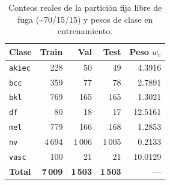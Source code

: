 \begin{table}[htbp]\centering\normalsize
\setlength{\tabcolsep}{8pt}
\caption{Conteos reales de la partición fija libre de fuga (\textasciitilde 70/15/15) y pesos de clase en entrenamiento.}
\begin{tabularx}{\textwidth}{>{\raggedright\arraybackslash}Xrrrr}\toprule
\textbf{Clase} & \textbf{Train} & \textbf{Val} & \textbf{Test} & \textbf{Peso $w_c$} \\ \midrule
\texttt{akiec} & 228 & 50 & 49 & 4.3916 \\
\texttt{bcc} & 359 & 77 & 78 & 2.7891 \\
\texttt{bkl} & 769 & 165 & 165 & 1.3021 \\
\texttt{df} & 80 & 18 & 17 & 12.5161 \\
\texttt{mel} & 779 & 166 & 168 & 1.2853 \\
\texttt{nv} & 4\,694 & 1\,006 & 1\,005 & 0.2133 \\
\texttt{vasc} & 100 & 21 & 21 & 10.0129 \\
\midrule
\textbf{Total} & \textbf{7\,009} & \textbf{1\,503} & \textbf{1\,503} & --- \\
\bottomrule\end{tabularx}\end{table}
